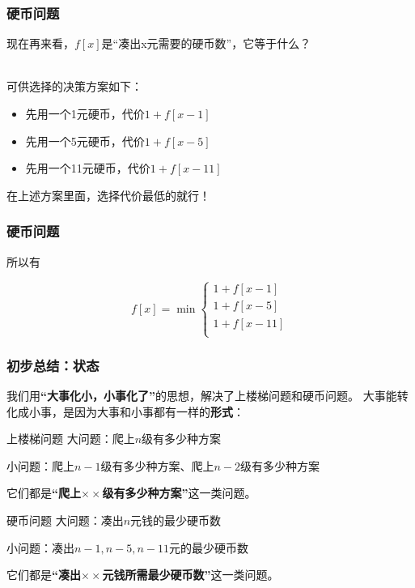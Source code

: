 \documentclass{beamer}
\begin{document}
\begin{frame}
    \frametitle{硬币问题}

    现在再来看，$f[x]$是“凑出x元需要的硬币数”，它等于什么？

    ~\\

    可供选择的决策方案如下：

    \begin{itemize}
        \item 先用一个1元硬币，代价$1+f[x-1]$
        \item 先用一个5元硬币，代价$1+f[x-5]$
        \item 先用一个11元硬币，代价$1+f[x-11]$
    \end{itemize}
    
    在上述方案里面，选择代价最低的就行！

\end{frame}

\begin{frame}
    \frametitle{硬币问题}

    所以有

    \[f[x] = \min \begin{cases}
        1+f[x-1] \\
        1+f[x-5] \\
        1+f[x-11] \\
    \end{cases} \]

\end{frame}

\begin{frame}
    \frametitle{初步总结：状态}

    我们用\textbf{“大事化小，小事化了”}的思想，解决了上楼梯问题和硬币问题。
    大事能转化成小事，是因为大事和小事都有一样的\textbf{形式}：

    \begin{block}{上楼梯问题}
        大问题：爬上$n$级有多少种方案

        小问题：爬上$n-1$级有多少种方案、爬上$n-2$级有多少种方案

        它们都是\textbf{“爬上$\times\times$级有多少种方案”}这一类问题。
    \end{block}

    \begin{block}{硬币问题}
        大问题：凑出$n$元钱的最少硬币数

        小问题：凑出$n-1,n-5,n-11$元的最少硬币数

        它们都是\textbf{“凑出$\times\times$元钱所需最少硬币数”}这一类问题。
    \end{block}

\end{frame}
\end{document}

